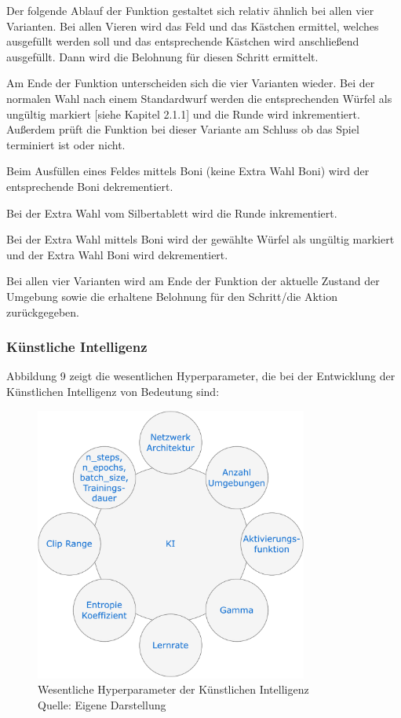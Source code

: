 Der folgende Ablauf der Funktion gestaltet sich relativ ähnlich bei allen vier Varianten. Bei allen Vieren wird das Feld und das Kästchen ermittel, welches ausgefüllt werden soll und das entsprechende Kästchen wird anschließend ausgefüllt. Dann wird die Belohnung für diesen Schritt ermittelt.

Am Ende der Funktion unterscheiden sich die vier Varianten wieder. Bei der normalen Wahl nach einem Standardwurf werden die entsprechenden Würfel als ungültig markiert [siehe Kapitel 2.1.1] und die Runde wird inkrementiert. Außerdem prüft die Funktion bei dieser Variante am Schluss ob das Spiel terminiert ist oder nicht.

Beim Ausfüllen eines Feldes mittels Boni (keine Extra Wahl Boni) wird der entsprechende Boni dekrementiert.

Bei der Extra Wahl vom Silbertablett wird die Runde inkrementiert.

Bei der Extra Wahl mittels Boni wird der gewählte Würfel als ungültig markiert und der Extra Wahl Boni wird dekrementiert.

Bei allen vier Varianten wird am Ende der Funktion der aktuelle Zustand der Umgebung sowie die erhaltene Belohnung für den Schritt/die Aktion zurückgegeben.

\subsubsection{Künstliche Intelligenz}
Abbildung 9 zeigt die wesentlichen Hyperparameter, die bei der Entwicklung der Künstlichen Intelligenz von Bedeutung sind:
\nopagebreak
\begin{figure}[H]
	\includegraphics[width=0.8\textwidth]{Bilder/KI} 
	\caption[Wesentliche Hyperparameter der Künstlichen Intelligenz]{Wesentliche Hyperparameter der Künstlichen Intelligenz\\ Quelle: Eigene Darstellung}
\end{figure}

